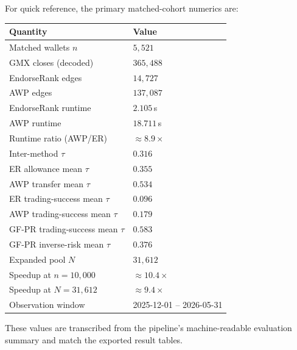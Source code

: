 
For quick reference, the primary matched-cohort numerics are:

\begin{center}
\begin{tabular}{ll}
\toprule
Quantity & Value \\
\midrule
Matched wallets $n$ & $5{,}521$ \\
GMX closes (decoded) & $365{,}488$ \\
EndorseRank edges & $14{,}727$ \\
AWP edges & $137{,}087$ \\
EndorseRank runtime & $2.105$\,s \\
AWP runtime & $18.711$\,s \\
Runtime ratio (AWP/ER) & $\approx 8.9\times$ \\
Inter-method $\tau$ & $0.316$ \\
ER allowance mean $\tau$ & $0.355$ \\
AWP transfer mean $\tau$ & $0.534$ \\
ER trading-success mean $\tau$ & $0.096$ \\
AWP trading-success mean $\tau$ & $0.179$ \\
GF-PR trading-success mean $\tau$ & $0.583$ \\
GF-PR inverse-risk mean $\tau$ & $0.376$ \\
Expanded pool $N$ & $31{,}612$ \\
Speedup at $n=10{,}000$ & $\approx 10.4\times$ \\
Speedup at $N=31{,}612$ & $\approx 9.4\times$ \\
Observation window & 2025-12-01 -- 2026-05-31 \\
\bottomrule
\end{tabular}
\end{center}

These values are transcribed from the pipeline's machine-readable evaluation summary and match the exported result tables.
